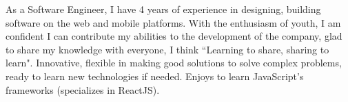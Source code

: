 

\begin{cvparagraph}

As a Software Engineer, I have 4 years of experience in designing, building software on the web and mobile platforms. With the enthusiasm of youth, I am confident I can contribute my abilities to the development of the company, glad to share my knowledge with everyone, I think ``Learning to share, sharing to learn". Innovative, flexible in making good solutions to solve complex problems, ready to learn new technologies if needed. Enjoys to learn JavaScript's frameworks (specializes in ReactJS).
\end{cvparagraph}
